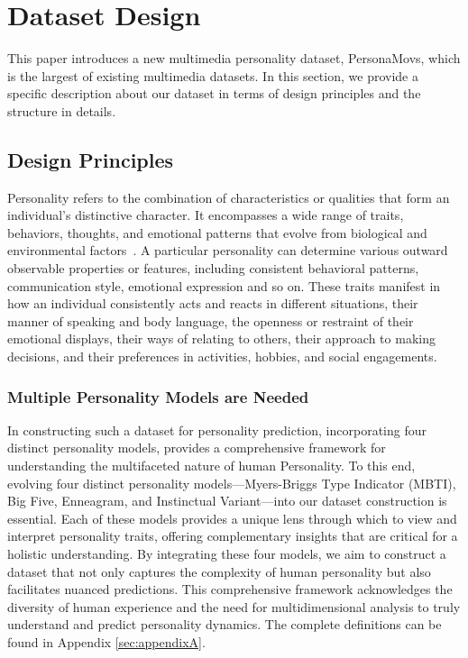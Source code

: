 \section{Dataset Design}

This paper introduces a new multimedia personality dataset, PersonaMovs, which is the largest of existing multimedia datasets. In this section, we provide a specific description about our dataset in terms of design principles and the structure in details.

\subsection{Design Principles}
Personality refers to the combination of characteristics or qualities that form an individual's distinctive character. It encompasses a wide range of traits, behaviors, thoughts, and emotional patterns that evolve from biological and environmental factors~\citep{6406319}. A particular personality can determine various outward observable properties or features, including consistent behavioral patterns, communication style, emotional expression and so on. These traits manifest in how an individual consistently acts and reacts in different situations, their manner of speaking and body language, the openness or restraint of their emotional displays, their ways of relating to others, their approach to making decisions, and their preferences in activities, hobbies, and social engagements.
\subsubsection{Multiple Personality Models are Needed} 
In constructing such a dataset for personality prediction, incorporating four distinct personality models, provides a comprehensive framework for understanding the multifaceted nature of human Personality. To this end, evolving four distinct personality models—Myers-Briggs Type Indicator (MBTI), Big Five, Enneagram, and Instinctual Variant—into our dataset construction is essential. Each of these models provides a unique lens through which to view and interpret personality traits, offering complementary insights that are critical for a holistic understanding. By integrating these four models, we aim to construct a dataset that not only captures the complexity of human personality but also facilitates nuanced predictions. This comprehensive framework acknowledges the diversity of human experience and the need for multidimensional analysis to truly understand and predict personality dynamics. The complete definitions can be found in Appendix \ref{sec:appendixA}.
